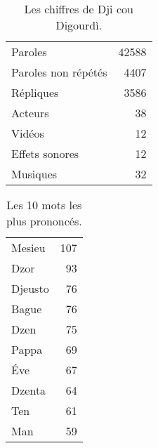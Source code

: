 
\vfill
\begin{table}[h]
\centering
\caption{Les chiffres de Dji cou Digourdì.}
\begin{tabular}{lr}
    \toprule
Paroles & 42588 \\
Paroles non répétés & 4407 \\
Répliques & 3586 \\
Acteurs & 38 \\
Vidéos & 12 \\
Effets sonores & 12 \\
Musiques & 32 \\
\bottomrule
\end{tabular}%
\end{table}
\vfill
\newpage
\vfill
\begin{table}[h]
\centering
\caption{Les 10 mots les plus prononcés.}
\begin{tabular}{lr}
    \toprule

\multicolumn{1}{l}{Mesieu} &107\\
\multicolumn{1}{l}{Dzor} &93\\
\multicolumn{1}{l}{Djeusto} &76\\
\multicolumn{1}{l}{Bague} &76\\
\multicolumn{1}{l}{Dzen} &75\\
\multicolumn{1}{l}{Pappa} &69\\
\multicolumn{1}{l}{Éve} &67\\
\multicolumn{1}{l}{Dzenta} &64\\
\multicolumn{1}{l}{Ten} &61\\
\multicolumn{1}{l}{Man} &59\\
\bottomrule
\end{tabular}%
\end{table}
\vfill
\newpage
\scriptsize
